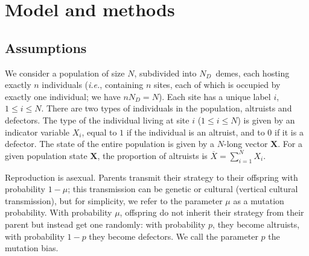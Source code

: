 \documentclass[11pt, letterpaper]{article}
\newcommand{\ie}{\textit{i.e.}}
\newcommand{\ndemes}{N_D}
\begin{document}



\section{Model and methods}

\subsection{Assumptions}

We consider a population of size $N$, subdivided into $\ndemes$~demes, each hosting exactly $n$ individuals (\ie, containing $n$ sites, each of which is occupied by exactly one individual; we have $n \ndemes = N$). Each site has a unique label $i$, $1\leq i \leq N$. There are two types of individuals in the population, altruists and defectors. The type of the individual living at site $i$ ($1\leq i \leq N$) is given by an indicator variable $X_i$, equal to $1$ if the individual is an altruist, and to $0$ if it is a defector. The state of the entire population is given by a $N$-long vector $\mathbf{X}$. For a given population state $\mathbf{X}$, the proportion of altruists is $\overline{X} = \sum_{i=1}^N X_i$. 

Reproduction is asexual. Parents transmit their strategy to their offspring with probability $1-\mu$; this transmission can be genetic or cultural (vertical cultural transmission), but for simplicity, we refer to the parameter $\mu$ as a mutation probability. With probability $\mu$, offspring do not inherit their strategy from their parent but instead get one randomly: with probability $p$, they become altruists, with probability $1-p$ they become defectors. We call the parameter $p$ the mutation bias. 
\end{document}
